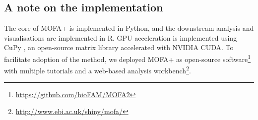 

\subsection{A note on the implementation}

The core of MOFA+ is implemented in Python, and the downstream analysis and visualisations are implemented in R. GPU acceleration is implemented using CuPy \cite{Okuta2017}, an open-source matrix library accelerated with NVIDIA CUDA. To facilitate adoption of the method, we deployed MOFA+ as open-source software\footnote{\url{https://github.com/bioFAM/MOFA2}} with multiple tutorials and a web-based analysis workbench\footnote{\url{http://www.ebi.ac.uk/shiny/mofa/}}.%



